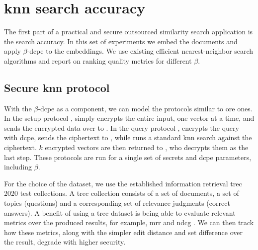 	\section{\texorpdfstring{\acrshort{knn}}{kNN} search accuracy}\label{section:knn-snapshot:search}

		The first part of a practical and secure outsourced similarity search application is the search accuracy.
		In this set of experiments we embed the documents and apply $\beta$-\acrshort{dcpe} to the embeddings.
		We use existing efficient nearest-neighbor search algorithms and report on ranking quality metrics for different $\beta$.

		\subsection{Secure \texorpdfstring{\acrshort{knn}}{kNN} protocol}

			With the $\beta$-\acrshort{dcpe} as a component, we can model the protocols similar to \acrshort{ore} ones.
			In the setup protocol \protocolSetup{}, \user{} simply encrypts the entire input, one vector at a time, and sends the encrypted data over to \server{}.
			In the query protocol \protocolQuery{}, \user{} encrypts the query with \acrshort{dcpe}, sends the ciphertext to \server{}, while \server{} runs a standard \acrshort{knn} search against the ciphertext.
			$k$ encrypted vectors are then returned to \user{}, who decrypts them as the last step.
			These protocols are run for a single set of secrets and \acrshort{dcpe} parameters, including $\beta$.

			For the choice of the dataset, we use the established information retrieval \acrshort{trec} 2020 test collections.
			A \acrshort{trec} collection consists of a set of documents, a set of topics (questions) and a corresponding set of relevance judgments (correct answers).
			A benefit of using a \acrshort{trec} dataset is being able to evaluate relevant metrics over the produced results, for example, \acrshort{mrr} \cite{mrr} and \acrshort{ndcg} \cite{dcg}.
			We can then track how these metrics, along with the simpler edit distance and set difference over the result, degrade with higher security.

